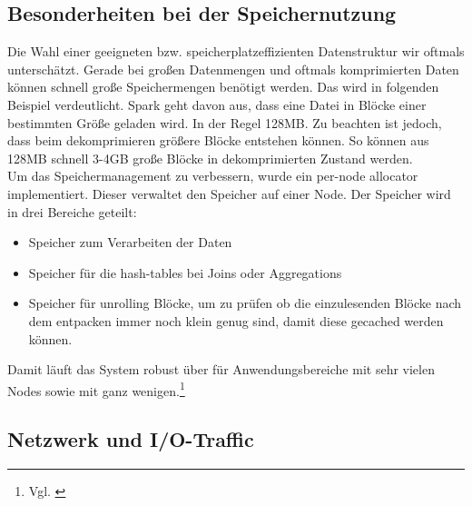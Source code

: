 \subsection{Besonderheiten bei der Speichernutzung}
Die Wahl einer geeigneten bzw. speicherplatzeffizienten Datenstruktur wir oftmals unterschätzt. Gerade bei großen Datenmengen und oftmals komprimierten Daten können schnell große Speichermengen benötigt werden. Das wird in folgenden Beispiel verdeutlicht.
Spark geht davon aus, dass eine Datei in Blöcke einer bestimmten Größe geladen wird. In der Regel 128MB. Zu beachten ist jedoch, dass beim dekomprimieren größere Blöcke entstehen können. So können aus 128MB schnell 3-4GB große Blöcke in dekomprimierten Zustand werden. \\ 

\noindent
Um das Speichermanagement zu verbessern, wurde ein per-node allocator implementiert. Dieser verwaltet den Speicher auf einer Node. 
Der Speicher wird in drei Bereiche geteilt:
\begin{itemize}
	\item Speicher zum Verarbeiten der Daten
	\item Speicher für die hash-tables bei Joins oder Aggregations
	\item Speicher für \glqq{}unrolling\grqq{} Blöcke, um zu prüfen ob die einzulesenden Blöcke nach dem entpacken immer noch klein genug sind, damit diese gecached werden können.
\end{itemize}
\noindent
Damit läuft das System robust über für Anwendungsbereiche mit sehr vielen Nodes sowie mit ganz wenigen.\footnote{Vgl. \cite{ADD+15}}

\subsection{Netzwerk und I/O-Traffic}

